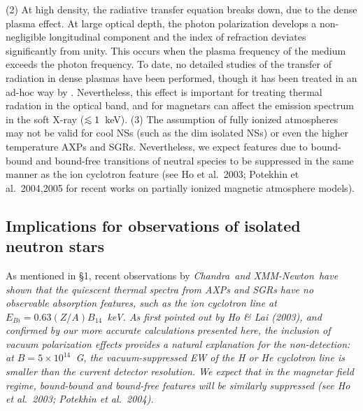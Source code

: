 \documentclass[useAMS,onecolumn,usenatbib,usegraphicx]{mn2e}
\def\lo{\mathrel{\raise.3ex\hbox{$<$}\mkern-14mu\lower0.6ex\hbox{$\sim$}}}
\begin{document}
(2) At high density, the radiative transfer equation breaks down, due 
to the dense plasma effect.
At large optical depth, the photon polarization develops a non-negligible
longitudinal component and the index of refraction deviates
significantly from unity.  This occurs when the plasma frequency of
the medium exceeds the photon frequency. 
To date, no detailed studies of the
transfer of radiation in dense plasmas have been performed, though it
has been treated in an ad-hoc way by \citet[][]{Hoetal03a}.
Nevertheless, this effect is important for treating thermal radation
in the optical band, and for magnetars can affect the emission
spectrum in the soft X-ray ($\lo 1$~keV).
(3) The assumption of fully ionized atmospheres may not be valid for cool
NSs (such as the dim isolated NSs) or 
even the higher temperature AXPs and SGRs. Nevertheless, we expect
features due to bound-bound and bound-free transitions of neutral
species to be suppressed in the same manner as the ion cyclotron feature 
(see Ho et al.~2003; Potekhin et al.~2004,2005 for recent works
on partially ionized magnetic atmosphere models).

\subsection{Implications for observations of isolated neutron stars}

As mentioned in 
\S 1, recent observations by 
\it{Chandra}\rm\ and \it{XMM-Newton}\rm\ have shown that 
the quiescent thermal spectra from AXPs and SGRs have 
no observable absorption features, 
such as the ion cyclotron line at $E_{Bi}=0.63(Z/A)B_{14}$~keV.
As first pointed out by Ho \& Lai (2003), and confirmed by 
our more accurate calculations presented here, 
the inclusion of vacuum polarization effects provides a natural 
explanation for the non-detection: at $B=5\times 10^{14}$~G, 
%
%
the vacuum-suppressed EW of the H or He cyclotron line is
smaller than the current detector resolution.  
We expect that in the magnetar field regime,
bound-bound and bound-free features will be similarly suppressed
(see Ho et al.~2003; Potekhin et al.~2004).
\end{document}
